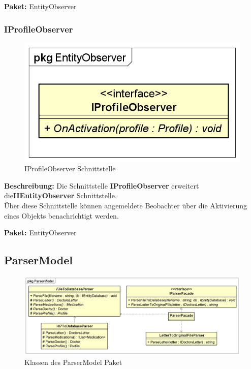 \documentclass[a4paper]{scrreprt}
\begin{document}
\textbf{Paket:} EntityObserver

\subsubsection{IProfileObserver}
\begin{figure}[H]
\centering
\includegraphics[width=0.75\textheight]{graphics/Klassendiagramme/Model/IProfileObserver.png}
\caption{IProfileObserver Schnittstelle}
\end{figure}
\textbf{Beschreibung:} Die Schnittstelle \textbf{IProfileObserver} erweitert die\textbf{IIEntityObserver} Schnittstelle.\\
Über diese Schnittstelle können angemeldete Beobachter über die Aktivierung eines Objekts benachrichtigt werden.

\textbf{Paket:} EntityObserver

\subsection{ParserModel}
\begin{figure}[H]
\centering
\includegraphics[width=0.75\textheight]{graphics/Klassendiagramme/Model/ParserModelPackage.png}
\caption{Klassen des ParserModel Paket}
\end{figure}
\end{document}
